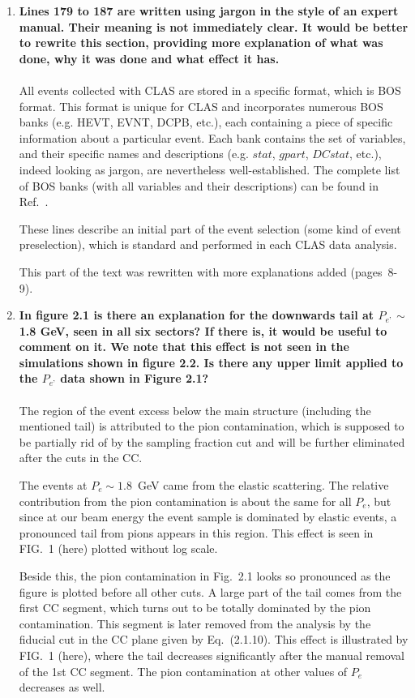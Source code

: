 \documentclass[,superscriptaddress,showpacs,amssymb,amsmath,amsfonts,linenumbers,article]{revtex4-1}
\begin{document}
\begin{enumerate}[label=\textbf{\arabic*}.]
\item {\bf Lines 179 to 187 are written using jargon in the style of an expert manual. Their meaning is not immediately clear.  It would be better to rewrite this section, providing more explanation of what was done, why it was done and what effect it has.} \\ \\
All events collected with CLAS are stored in a specific format, which is BOS format. This format is unique for CLAS and incorporates numerous BOS banks (e.g. HEVT, EVNT, DCPB, etc.), each containing a piece of specific information about a particular event. Each bank contains the set of variables, and their specific names and descriptions (e.g. $stat$, $gpart$, $DCstat$, etc.), indeed looking as jargon, are nevertheless well-established. The complete list of BOS banks (with all variables and their descriptions) can be found in Ref.~\cite{BOS}.

These lines describe an initial part of the event selection (some kind of event preselection), which is standard and performed in each CLAS data analysis. 

This part of the text was rewritten with more explanations added (pages~8-9).


\item {\bf In figure 2.1 is there an explanation for the downwards tail at $P_{e’}$ $\sim$1.8 GeV, seen in all six sectors? If there is, it would be useful to comment on it. We note that this effect is not seen in the simulations shown in figure 2.2. Is there any upper limit applied to the $P_{e’}$ data shown in Figure 2.1?}\\ \\
The region of the event excess below the main structure (including the mentioned tail) is attributed to the pion contamination, which is supposed to be partially rid of by the sampling fraction cut and will be further eliminated after the cuts in the CC. 

The events at $P_{e} \sim 1.8$~GeV came from the elastic scattering. The relative contribution from the pion contamination is about the same for all $P_{e}$, but since at our beam energy the event sample is dominated by elastic events, a pronounced tail from pions appears in this region. This effect is seen in FIG.~1 (here) plotted without log scale.

Beside this, the pion contamination in Fig.~2.1 looks so pronounced as the figure is plotted before all other cuts. A large part of the tail comes from the first CC segment, which turns out to be totally dominated by the pion contamination. This segment is later removed from the analysis by the fiducial cut in the CC plane given by Eq.~(2.1.10). This effect is illustrated by FIG.~1 (here), where the tail decreases significantly after the manual removal of the 1st CC segment. The pion contamination at other values of $P_{e}$ decreases as well.



\end{enumerate}
\end{document}
